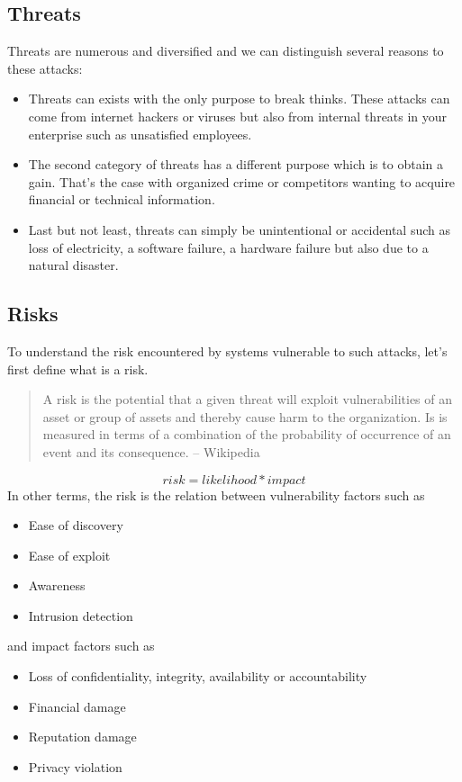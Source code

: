 \subsection{Threats}
Threats are numerous and diversified and we can distinguish several reasons to
these attacks:
\begin{itemize}
\item Threats can exists with the only purpose to break thinks. These attacks
	can come from internet hackers or viruses but also from internal threats
	in your enterprise such as unsatisfied employees.
\item The second category of threats has a different purpose which is to
	obtain a gain. That's the case with organized crime or competitors wanting
	to acquire financial or technical information.
\item Last but not least, threats can simply be unintentional or accidental
	such as loss of electricity, a software failure, a hardware failure but
	also due to a natural disaster.
\end{itemize}

\subsection{Risks}
To understand the risk encountered by systems vulnerable to such attacks, let's
first define what is a risk.

\begin{quote}
A risk is the potential that a given threat will
exploit vulnerabilities of an asset or group of assets and thereby cause harm to
the organization. Is is measured in terms of a combination of the probability of
occurrence of an event and its consequence.
-- Wikipedia
\end{quote}
\[
   risk = likelihood * impact
\]
In other terms, the risk is the relation between vulnerability factors such as 
\begin{itemize}
\item Ease of discovery
\item Ease of exploit
\item Awareness
\item Intrusion detection
\end{itemize}
and impact factors such as
\begin{itemize}
\item Loss of confidentiality, integrity, availability or accountability
\item Financial damage
\item Reputation damage
\item Privacy violation
\end{itemize}

